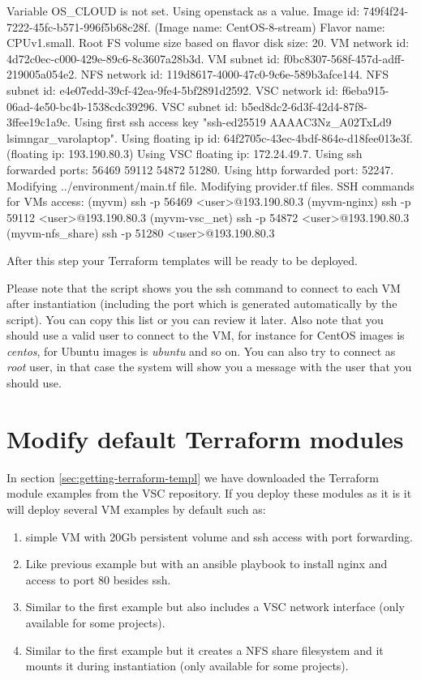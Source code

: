 \begin{prompt}
Variable OS_CLOUD is not set. Using openstack as a value.
Image id: 749f4f24-7222-45fc-b571-996f5b68c28f. (Image name: CentOS-8-stream)
Flavor name: CPUv1.small.
Root FS volume size based on flavor disk size: 20.
VM network id: 4d72c0ec-c000-429e-89c6-8c3607a28b3d.
VM subnet id: f0bc8307-568f-457d-adff-219005a054e2.
NFS network id: 119d8617-4000-47c0-9c6e-589b3afce144.
NFS subnet id: e4e07edd-39cf-42ea-9fe4-5bf2891d2592.
VSC network id: f6eba915-06ad-4e50-bc4b-1538cdc39296.
VSC subnet id: b5ed8dc2-6d3f-42d4-87f8-3ffee19c1a9c.
Using first ssh access key "ssh-ed25519 AAAAC3Nz_A02TxLd9 lsimngar_varolaptop".
Using floating ip id: 64f2705c-43ec-4bdf-864e-d18fee013e3f. (floating ip: 193.190.80.3)
Using VSC floating ip: 172.24.49.7.
Using ssh forwarded ports: 56469 59112 54872 51280.
Using http forwarded port: 52247.
Modifying ../environment/main.tf file.
Modifying provider.tf files.
SSH commands for VMs access:
(myvm)           ssh -p 56469 <user>@193.190.80.3
(myvm-nginx)     ssh -p 59112 <user>@193.190.80.3
(myvm-vsc_net)   ssh -p 54872 <user>@193.190.80.3
(myvm-nfs_share) ssh -p 51280 <user>@193.190.80.3
\end{prompt}

After this step your Terraform templates will be ready to be deployed.

 Please note that the script shows you the ssh command to connect to each VM
after instantiation (including the port which is generated automatically by the script).
You can copy this list or you can review it later. Also note that you should use a valid user
to connect to the VM, for instance for CentOS images is \emph{centos},
for Ubuntu images is \emph{ubuntu} and so on.
You can also try to connect as \emph{root} user, in that case the system will show you a message
with the user that you should use.

\section{Modify default Terraform modules}\label{sec:modify-terraform-modules}
In section \ref{sec:getting-terraform-templ} we have downloaded the Terraform module examples from
the VSC repository.
If you deploy these modules as it is it will deploy several VM examples by default such as:


\begin{enumerate}
\item {} simple VM with 20Gb persistent volume and ssh access with port forwarding.
\item {} Like previous example but with an ansible playbook to install
nginx and access to port 80 besides ssh.
\item {} Similar to the first example but also includes a VSC network
interface (only available for some projects).
\item {} Similar to the first example but it creates a NFS share
filesystem and it mounts it during instantiation (only available for some projects).
\end{enumerate}


